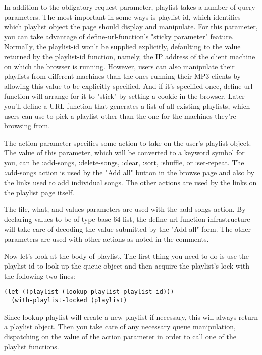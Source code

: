 In addition to the obligatory request parameter, playlist takes a number of query
parameters. The most important in some ways is playlist-id, which identifies which
playlist object the page should display and manipulate. For this parameter, you can take
advantage of define-url-function's "sticky parameter" feature. Normally, the playlist-id
won't be supplied explicitly, defaulting to the value returned by the playlist-id
function, namely, the IP address of the client machine on which the browser is
running. However, users can also manipulate their playlists from different machines than
the ones running their MP3 clients by allowing this value to be explicitly specified. And
if it's specified once, define-url-function will arrange for it to "stick" by setting a
cookie in the browser. Later you'll define a URL function that generates a list of all
existing playlists, which users can use to pick a playlist other than the one for the
machines they're browsing from.

The action parameter specifies some action to take on the user's playlist object. The
value of this parameter, which will be converted to a keyword symbol for you, can be
:add-songs, :delete-songs, :clear, :sort, :shuffle, or :set-repeat. The :add-songs action
is used by the "Add all" button in the browse page and also by the links used to add
individual songs. The other actions are used by the links on the playlist page itself.

The file, what, and values parameters are used with the :add-songs action. By declaring
values to be of type base-64-list, the define-url-function infrastructure will take care
of decoding the value submitted by the "Add all" form. The other parameters are used with
other actions as noted in the comments.

Now let's look at the body of playlist. The first thing you need to do is use the
playlist-id to look up the queue object and then acquire the playlist's lock with the
following two lines:

\begin{lstlisting}
(let ((playlist (lookup-playlist playlist-id)))
  (with-playlist-locked (playlist)
\end{lstlisting}

Since lookup-playlist will create a new playlist if necessary, this will always return a
playlist object. Then you take care of any necessary queue manipulation, dispatching on
the value of the action parameter in order to call one of the playlist functions.

